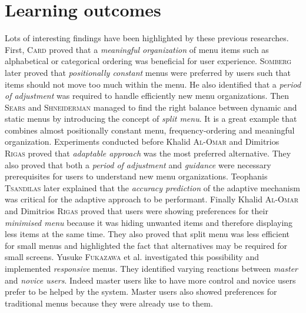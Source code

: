 \section{Learning outcomes}
Lots of interesting findings have been highlighted by these previous 
researches. 
First, \textsc{Card} proved that a \textit{meaningful organization} of menu 
items such 
as alphabetical or categorical ordering was beneficial for user experience. 
\textsc{Somberg} later proved that \textit{positionally constant} menus were 
preferred 
by users such that items should not move too much within the menu. He also 
identified that a \textit{period of adjustment} was required to handle 
efficiently new menu organizations. Then \textsc{Sears} and 
\textsc{Shneiderman} managed to find 
the right balance between dynamic and static menus by introducing the concept 
of 
\textit{split menu}. It is a great example that combines almost positionally 
constant menu, frequency-ordering and meaningful organization. Experiments 
conducted before Khalid \textsc{Al-Omar} and Dimitrios \textsc{Rigas} proved 
that 
\textit{adaptable approach} was the most preferred alternative. They also 
proved that both a \textit{period of adjustment} and \textit{guidance} were 
necessary prerequisites for users to understand new menu organizations. 
Teophanis \textsc{Tsandilas} later explained that the \textit{accuracy 
prediction} of 
the adaptive mechanism was critical for the adaptive approach to be performant. 
Finally Khalid \textsc{Al-Omar} and Dimitrios \textsc{Rigas} proved that users 
were showing 
preferences for their \textit{minimised menu} because it was hiding unwanted 
items and therefore displaying less items at the same time. They also proved 
that split menu was less efficient for small menus and highlighted the fact 
that alternatives may be required for small screens. Yusuke \textsc{Fukazawa} et 
al. 
investigated this possibility and implemented \textit{responsive} menus. They 
identified varying reactions between \textit{master} and \textit{novice users}. 
Indeed master users like to have more control and novice users prefer to be 
helped by the system. Master users also showed preferences for traditional menus 
because they were already use to them.

